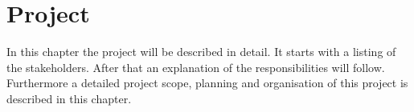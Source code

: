 \chapter{Project}
In this chapter the project will be described in detail. It starts with a listing of the
stakeholders. After that an explanation of the responsibilities will follow. Furthermore 
a detailed project scope, planning and organisation of this project is described in this chapter.




